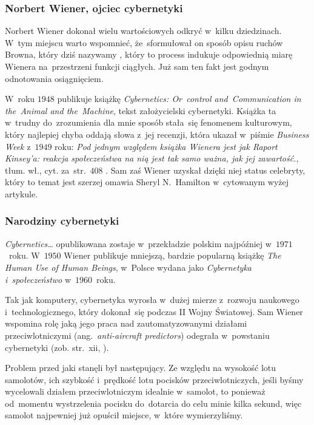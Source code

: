 \documentclass[10pt,t]{beamer}
\begin{document}
\begin{frame}
  \frametitle{Norbert Wiener, ojciec cybernetyki}


  Norbert Wiener dokonał wielu wartościowych odkryć w~kilku dziedzinach.
  W~tym miejscu warto wspomnieć, że~sformułował on sposób opisu ruchów
  Browna, który dziś nazywamy
  , który to process indukuje odpowiednią miarę Wienera
  na~przestrzeni funkcji ciągłych. Już sam ten fakt jest godnym odnotowania
  osiągnięciem.

  W~roku $1948$ publikuje książkę
  {\textit{Cybernetics: Or~control and~Communication in the~Animal and
      the~Machine}}, tekst założycielski cybernetyki. Książka ta w~trudny
  do~zrozumienia dla mnie sposób stała~się fenomenem kulturowym, który
  najlepiej chyba oddają słowa z~jej recenzji, która ukazał w~piśmie
  \textit{Business Week} z~$1949$ roku: \textit{Pod jednym względem książka
    Wienera jest jak Raport Kinsey’a: reakcja społeczeństwa na nią jest tak
    samo ważna, jak jej zawartość.}, tłum. wł., cyt. za~str.~$408$
  \parencite{Hamilton-The-Charismatic-Cultural-Life-of-ETC-Pub-2017}. Sam
  zaś Wiener uzyskał dzięki niej status celebryty, który to temat jest
  szerzej omawia Sheryl N.~Hamilton w~cytowanym wyżej artykule.

\end{frame}





\begin{frame}
  \frametitle{Narodziny cybernetyki}


  \textit{Cybernetics\ldots} opublikowana zostaje w~przekładzie polskim
  najpóźniej w~$1971$~roku. W~$1950$ Wiener publikuje mniejszą, bardzie
  popularną książkę
  {\textit{The Human Use of Human Beings}}, w~Polsce wydana jako
  \textit{Cybernetyka i~społeczeństwo} w~$1960$~roku.

  Tak jak komputery, cybernetyka wyrosła w~dużej mierze z~rozwoju naukowego
  i~technologicznego, który dokonał~się podczas II Wojny Światowej. Sam
  Wiener wspomina rolę jaką jego praca nad zautomatyzowanymi działami
  przeciwlotniczymi (ang.~\textit{anti-aircraft predictors}) odegrała
  w~powstaniu cybernetyki (zob. str.~xii,
  \parencite{Wiener-Cybernetics-Second-edition-Pub-2016}).

  Problem przed jaki stanęli był następujący. Ze względu na wysokość lotu
  samolotów, ich szybkość i~prędkość lotu pocisków przeciwlotniczych, jeśli
  byśmy wycelowali działem przeciwlotniczym idealnie w~samolot, to ponieważ
  od~momentu wystrzelenia pocisku do~dotarcia do celu minie kilka sekund,
  więc samolot najpewniej już opuścił miejsce, w~które wymierzyliśmy.

\end{frame}
\end{document}
